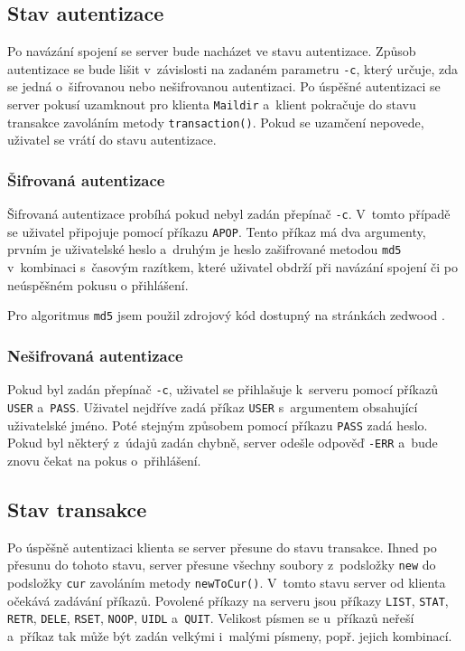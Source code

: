 \documentclass[a4paper, 11pt]{article}
\begin{document}
\subsection{Stav autentizace}
Po navázání spojení se server bude nacházet ve stavu autentizace. Způsob autentizace se bude lišit v~závislosti na zadaném parametru \texttt{-c}, který určuje, zda se jedná o~šifrovanou nebo nešifrovanou autentizaci. Po úspěšné autentizaci se server pokusí uzamknout pro klienta \texttt{Maildir} a~klient pokračuje do stavu transakce zavoláním metody \texttt{transaction()}. Pokud se uzamčení nepovede, uživatel se vrátí do stavu autentizace. 

\subsubsection{Šifrovaná autentizace}
Šifrovaná autentizace probíhá pokud nebyl zadán přepínač \texttt{-c}. V~tomto případě se uživatel připojuje pomocí příkazu \texttt{APOP}. Tento příkaz má dva argumenty, prvním je uživatelské heslo a~druhým je heslo zašifrované metodou \texttt{md5} v~kombinaci s~časovým razítkem, které uživatel obdrží při navázání spojení či po neúspěšném pokusu o přihlášení.

Pro algoritmus \texttt{md5} jsem použil zdrojový kód dostupný na stránkách zedwood \cite{zed} .

\subsubsection{Nešifrovaná autentizace}
Pokud byl zadán přepínač \texttt{-c}, uživatel se přihlašuje k~serveru pomocí příkazů \texttt{USER} a~\texttt{PASS}. Uživatel nejdříve zadá příkaz \texttt{USER} s~argumentem obsahující uživatelské jméno. Poté stejným způsobem pomocí příkazu \texttt{PASS} zadá heslo. Pokud byl některý z~údajů zadán chybně, server odešle odpověď \texttt{-ERR} a~bude znovu čekat na pokus o~přihlášení.

\subsection{Stav transakce}
Po úspěšně autentizaci klienta se server přesune do stavu transakce. Ihned po přesunu do tohoto stavu, server přesune všechny soubory z~podsložky \texttt{new} do podsložky \texttt{cur} zavoláním metody \texttt{newToCur()}. V~tomto stavu server od klienta očekává zadávání příkazů. Povolené příkazy na serveru jsou příkazy \texttt{LIST}, \texttt{STAT}, \texttt{RETR}, \texttt{DELE}, \texttt{RSET}, \texttt{NOOP}, \texttt{UIDL} a~\texttt{QUIT}. Velikost písmen se u~příkazů neřeší a~příkaz tak může být zadán velkými i~malými písmeny, popř. jejich kombinací.
\end{document}
